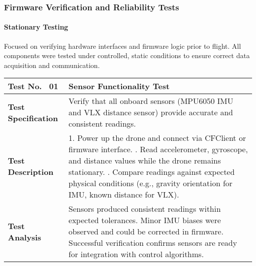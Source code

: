\subsubsection{Firmware Verification and Reliability Tests}

\paragraph{Stationary Testing} \leavevmode

Focused on verifying hardware interfaces and firmware logic prior to flight. All components were tested under controlled, static conditions to ensure correct data acquisition and communication.

\begin{table}[H]
\centering
\renewcommand{\arraystretch}{1.2}
\begin{tabular}{|p{3.5cm}|p{12cm}|}
\hline
\textbf{Test No. \, 01} & \textbf{Sensor Functionality Test} \\ \hline
\textbf{Test Specification} & 
Verify that all onboard sensors (MPU6050 IMU and VLX distance sensor) provide accurate and consistent readings. \\ \hline
\textbf{Test Description} & 
1. Power up the drone and connect via CFClient or firmware interface. \newline
2. Read accelerometer, gyroscope, and distance values while the drone remains stationary. \newline
3. Compare readings against expected physical conditions (e.g., gravity orientation for IMU, known distance for VLX). \\ \hline
\textbf{Test Analysis} & 
Sensors produced consistent readings within expected tolerances. Minor IMU biases were observed and could be corrected in firmware. Successful verification confirms sensors are ready for integration with control algorithms. \\ \hline
\end{tabular}
\end{table}

